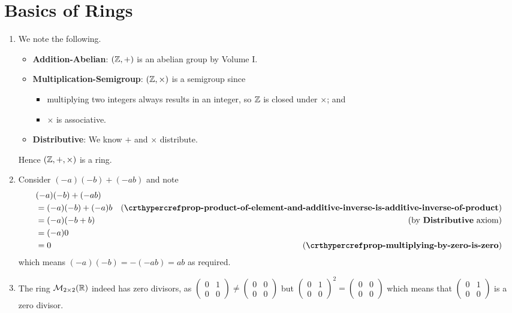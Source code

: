 \section{Basics of Rings}
\begin{enumerate}
    \item We note the following.
    \begin{itemize}
        \item \textbf{Addition-Abelian}: $(\mathbb{Z}, +)$ is an abelian group by Volume I.
        \item \textbf{Multiplication-Semigroup}: $(\mathbb{Z}, \times)$ is a semigroup since
        \begin{itemize}
            \item multiplying two integers always results in an integer, so $\mathbb{Z}$ is closed under $\times$; and
            \item $\times$ is associative.
        \end{itemize}
        \item \textbf{Distributive}: We know $+$ and $\times$ distribute.
    \end{itemize}
    Hence $(\mathbb{Z}, +, \times)$ is a ring.

    \item Consider $(-a)(-b) + (-ab)$ and note
    \begin{align*}
        &(-a)(-b) + (-ab)\\
        &= (-a)(-b) + (-a)b & (\text{\myref{prop-product-of-element-and-additive-inverse-is-additive-inverse-of-product}})\\
        &= (-a)(-b + b) & (\text{by \textbf{Distributive} axiom})\\
        &= (-a)0\\
        &= 0 & (\myref{prop-multiplying-by-zero-is-zero})
    \end{align*}
    which means $(-a)(-b) = -(-ab) = ab$ as required.

    \item The ring $\mathcal{M}_{2\times2}(\mathbb{R})$ indeed has zero divisors, as $\begin{pmatrix}0&1\\0&0\end{pmatrix} \neq \begin{pmatrix}0&0\\0&0\end{pmatrix}$ but $\begin{pmatrix}0&1\\0&0\end{pmatrix}^2 = \begin{pmatrix}0&0\\0&0\end{pmatrix}$ which means that $\begin{pmatrix}0&1\\0&0\end{pmatrix}$ is a zero divisor.
    

\end{enumerate}
